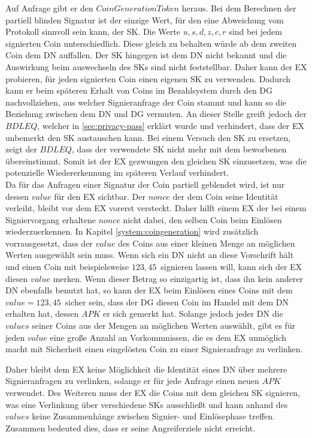 \documentclass[
	fontsize=11pt,
	headings=small,
	parskip=half,           %
	bibliography=totoc,
	numbers=noenddot,       %
	open=any,               %
]{scrreprt}
\begin{document}
Auf Anfrage gibt er den $CoinGenerationToken$ heraus. Bei dem Berechnen der partiell blinden Signatur ist der einzige Wert, für den eine Abweichung vom Protokoll sinnvoll sein kann, der SK. Die Werte $u,s,d,z,c,r$ sind bei jedem signierten Coin unterschiedlich. Diese gleich zu behalten würde ab dem zweiten Coin dem DN auffallen. Der SK hingegen ist dem DN nicht bekannt und die Auswirkung beim auswechseln des SKs sind nicht feststellbar. Daher kann der EX probieren, für jeden signierten Coin einen eigenen SK zu verwenden. Dadurch kann er beim späteren Erhalt von Coins im Bezahlsystem durch den DG nachvollziehen, aus welcher Signieranfrage der Coin stammt und kann so die Beziehung zwischen dem DN und DG vermuten. An dieser Stelle greift jedoch der $BDLEQ$, welcher in \ref{sec:privacy-pass} erklärt wurde und verhindert, dass der EX unbemerkt den SK austauschen kann. Bei einem Versuch den SK zu ersetzen, zeigt der $BDLEQ$, dass der verwendete SK nicht mehr mit dem beworbenen übereinstimmt. Somit ist der EX gezwungen den gleichen SK einzusetzen, was die potenzielle Wiedererkennung im späteren Verlauf verhindert.\\

Da für das Anfragen einer Signatur der Coin partiell geblendet wird, ist nur dessen $value$ für den EX sichtbar. Der $nonce$ der dem Coin seine Identität verleiht, bleibt vor dem EX vorerst versteckt. Daher hilft einem EX der bei einem Signiervorgang erhaltene $nonce$ nicht dabei, den selben Coin beim Einlösen wiederzuerkennen. In Kapitel \ref{system:coingeneration} wird zusätzlich vorrausgesetzt, dass der $value$ des Coins aus einer kleinen Menge an möglichen Werten ausgewählt sein muss. Wenn sich ein DN nicht an diese Vorschrift hält und einen Coin mit beispielsweise $123,45$\texteuro\ signieren lassen will, kann sich der EX diesen $value$ merken. Wenn dieser Betrag so einzigartig ist, dass ihn kein anderer DN ebenfalls benutzt hat, so kann der EX beim Einlösen eines Coins mit dem $value = 123,45$\texteuro\ sicher sein, dass der DG diesen Coin im Handel mit dem DN erhalten hat, dessen $APK$ er sich gemerkt hat. Solange jedoch jeder DN die $values$ seiner Coins aus der Mengen an möglichen Werten auswählt, gibt es für jeden $value$ eine große Anzahl an Vorkommnissen, die es dem EX unmöglich macht mit Sicherheit einen eingelösten Coin zu einer Signieranfrage zu verlinken.

Daher bleibt dem EX keine Möglichkeit die Identität eines DN über mehrere Signieranfragen zu verlinken, solange er für jede Anfrage einen neuen $APK$ verwendet. Des Weiteren muss der EX die Coins mit dem gleichen SK signieren, was eine Verlinkung über verschiedene SKs ausschließt und kann anhand des $values$ keine Zusammenhänge zwischen Signier- und Einlösephase treffen. Zusammen bedeuted dies, dass er seine Angreiferziele nicht erreicht.
\end{document}
